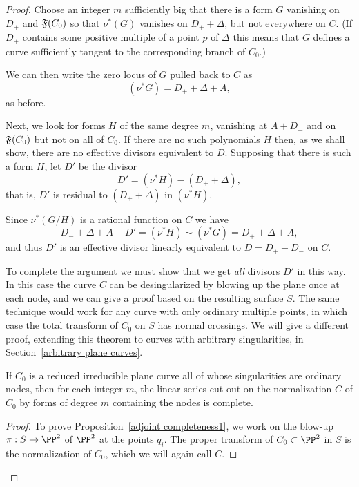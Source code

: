 \begin{proof}
 Choose an integer $m$ sufficiently big that there is a form $G$ vanishing on  $D_{+}$ and $\adj(C_{0})$ so that
 $\nu^{*}(G)$ vanishes on $D_{+}+\Delta$, but not everywhere on $C$.
 (If $D_{+}$ contains some positive multiple of a point $p$ of $\Delta$ this means that $G$ defines
 a curve sufficiently tangent to the corresponding branch of $C_0$.) 
 
 We can then write the zero locus of $G$ pulled back to $C$ as
$$
(\nu^*G) = D_{+} + \Delta + A,
$$
as before. 


Next, we look for forms $H$ of the same degree $m$, vanishing at $A+D_{-}$ and on $\adj(C_{0})$
 but not on all of $C_0$. If there are no such polynomials $H$ then, as we shall show,
there are no effective divisors equivalent to $D$. Supposing that there is such a form $H$, let $D'$ be the divisor 
$$
D' = (\nu^*H) -( D_{+} + \Delta),
$$
that is, $D'$ is residual to $( D_{+} + \Delta)$ in $(\nu^*H)$. 

Since $\nu^*(G/H)$ is a rational function on $C$ we have
$$
D_{-} +\Delta + A+ D' = (\nu^*H) \sim (\nu^*G) = D_{+} + \Delta + A,
$$
and thus $D'$ is an effective divisor linearly equivalent to $D = D_{+}-D_{-}$ on $C$.

To complete the argument we must show that we get \emph{all} divisors $D'$ in this way.
In this case the curve $C$ can be desingularized by blowing up the plane once at each node,
and we can give a proof based on the resulting surface $S$. The same technique would work for any curve with only
ordinary multiple points, in which case the total transform of $C_{0}$ on $S$ has normal crossings. We will give a different proof, extending this theorem to curves with arbitrary singularities, in Section~\ref{arbitrary plane curves}.

\begin{proposition}\label{adjoint completeness1}
If $C_{0}$ is a reduced irreducible plane curve all of whose singularities are ordinary nodes, then for each
integer $m$,
the linear series cut out on the normalization $C$ of $C_{0}$ by forms of degree $m$ containing the nodes
is complete.
\end{proposition}

\begin{proof}
To prove Proposition~\ref{adjoint completeness1}, we work on the blow-up $\pi : S \to \PP^2$ of $\PP^2$ at the points $q_i$. The proper transform of $C_0 \subset \PP^2$ in $S$ is the normalization of $C_0$, which we will again call $C$.


\end{proof}
\end{proof}
